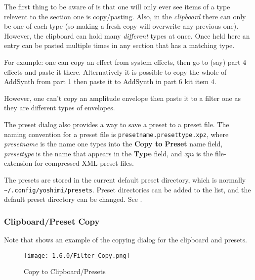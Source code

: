    The first thing to be aware of is that one will only ever see items of a type
   relevent to the section one is copy/pasting. Also, in the \textsl{clipboard}
   there can only be one of each type (so making a fresh copy will overwrite any
   previous one). However, the clipboard can hold many \textsl{different} types at
   once. Once held here an entry can be pasted multiple times in any section that
   has a matching type.

   For example: one can copy an effect from system effects, then go to (say) part 4
   effects and paste it there. Alternatively it is possible to copy the whole of
   AddSynth from part 1 then paste it to AddSynth in part 6 kit item 4.

   However, one can't copy an amplitude envelope then paste it to a filter one as
   they are different types of envelopes.

   The preset dialog also provides a way
   to save a preset to a preset file.
   The naming convention for a preset file is
   \texttt{presetname.presettype.xpz}, where
   \textsl{presetname} is the name one types into the \textbf{Copy to Preset}
   name field, \textsl{presettype} is the name that appears in the
   \textbf{Type} field, and \textsl{xpz} is the file-extension for compressed
   XML preset files.

   The presets are stored in the current default preset directory,
   which is normally
   \texttt{\textasciitilde/.config/yoshimi/presets}.
   Preset directories can be added to the list, and
   the default preset directory can be changed.
   See .

\subsubsection{Clipboard/Preset Copy}
\label{subsubsec:clipboard_copy}

   Note that \hspace {6 pt}shows an example of the copying
   dialog for the clipboard and presets.

\begin{figure}[H]
   \centering
   \texttt{[image: 1.6.0/Filter\_Copy.png]}
   \caption[Copy to Clipboard/Presets]{Copy to Clipboard/Presets}
   \label{fig:copy_to_clipboard/presets}
\end{figure}

   \setcounter{ItemCounter}{0}      %


